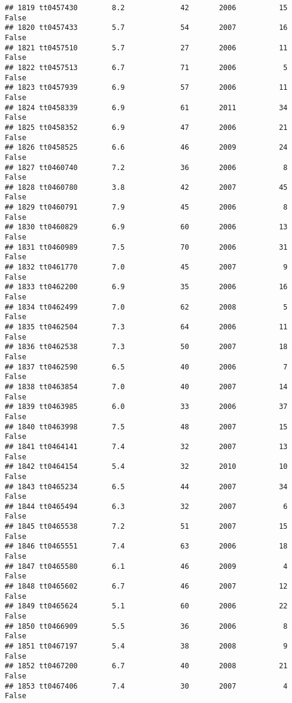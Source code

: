 \documentclass[
]{article}
\begin{document}
\begin{verbatim}
## 1819 tt0457430        8.2             42       2006          15   False
## 1820 tt0457433        5.7             54       2007          16   False
## 1821 tt0457510        5.7             27       2006          11   False
## 1822 tt0457513        6.7             71       2006           5   False
## 1823 tt0457939        6.9             57       2006          11   False
## 1824 tt0458339        6.9             61       2011          34   False
## 1825 tt0458352        6.9             47       2006          21   False
## 1826 tt0458525        6.6             46       2009          24   False
## 1827 tt0460740        7.2             36       2006           8   False
## 1828 tt0460780        3.8             42       2007          45   False
## 1829 tt0460791        7.9             45       2006           8   False
## 1830 tt0460829        6.9             60       2006          13   False
## 1831 tt0460989        7.5             70       2006          31   False
## 1832 tt0461770        7.0             45       2007           9   False
## 1833 tt0462200        6.9             35       2006          16   False
## 1834 tt0462499        7.0             62       2008           5   False
## 1835 tt0462504        7.3             64       2006          11   False
## 1836 tt0462538        7.3             50       2007          18   False
## 1837 tt0462590        6.5             40       2006           7   False
## 1838 tt0463854        7.0             40       2007          14   False
## 1839 tt0463985        6.0             33       2006          37   False
## 1840 tt0463998        7.5             48       2007          15   False
## 1841 tt0464141        7.4             32       2007          13   False
## 1842 tt0464154        5.4             32       2010          10   False
## 1843 tt0465234        6.5             44       2007          34   False
## 1844 tt0465494        6.3             32       2007           6   False
## 1845 tt0465538        7.2             51       2007          15   False
## 1846 tt0465551        7.4             63       2006          18   False
## 1847 tt0465580        6.1             46       2009           4   False
## 1848 tt0465602        6.7             46       2007          12   False
## 1849 tt0465624        5.1             60       2006          22   False
## 1850 tt0466909        5.5             36       2006           8   False
## 1851 tt0467197        5.4             38       2008           9   False
## 1852 tt0467200        6.7             40       2008          21   False
## 1853 tt0467406        7.4             30       2007           4   False

\end{verbatim}
\end{document}
